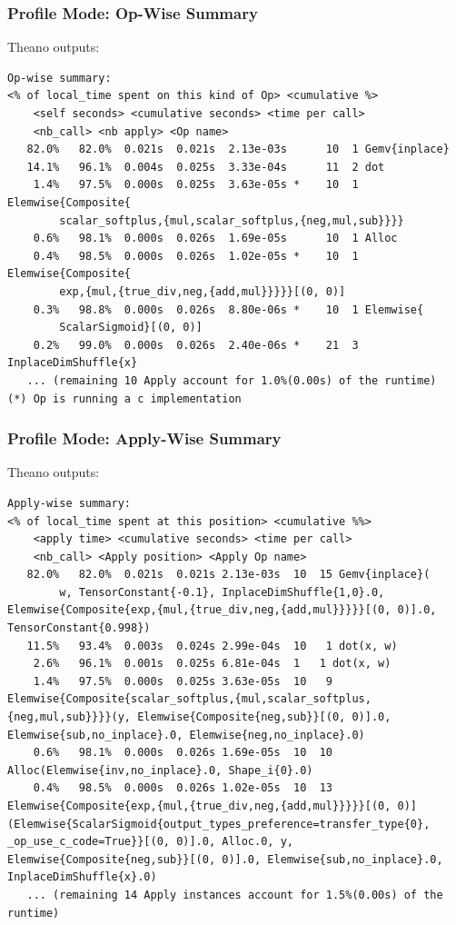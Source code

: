 \documentclass[a4paper,9pt]{beamer}
\begin{document}
\begin{frame}[fragile]
\frametitle{Profile Mode: Op-Wise Summary}
Theano outputs:
\vfill
\begin{Verbatim}
Op-wise summary:
<% of local_time spent on this kind of Op> <cumulative %>
    <self seconds> <cumulative seconds> <time per call>
    <nb_call> <nb apply> <Op name>
   82.0%   82.0%  0.021s  0.021s  2.13e-03s      10  1 Gemv{inplace}
   14.1%   96.1%  0.004s  0.025s  3.33e-04s      11  2 dot
    1.4%   97.5%  0.000s  0.025s  3.63e-05s *    10  1 Elemwise{Composite{
        scalar_softplus,{mul,scalar_softplus,{neg,mul,sub}}}}
    0.6%   98.1%  0.000s  0.026s  1.69e-05s      10  1 Alloc
    0.4%   98.5%  0.000s  0.026s  1.02e-05s *    10  1 Elemwise{Composite{
        exp,{mul,{true_div,neg,{add,mul}}}}}[(0, 0)]
    0.3%   98.8%  0.000s  0.026s  8.80e-06s *    10  1 Elemwise{
        ScalarSigmoid}[(0, 0)]
    0.2%   99.0%  0.000s  0.026s  2.40e-06s *    21  3 InplaceDimShuffle{x}
   ... (remaining 10 Apply account for 1.0%(0.00s) of the runtime)
(*) Op is running a c implementation
\end{Verbatim}
\end{frame}

\begin{frame}[fragile]
\frametitle{Profile Mode: Apply-Wise Summary}
Theano outputs:
\vfill
\begin{Verbatim}
Apply-wise summary:
<% of local_time spent at this position> <cumulative %%>
    <apply time> <cumulative seconds> <time per call>
    <nb_call> <Apply position> <Apply Op name>
   82.0%   82.0%  0.021s  0.021s 2.13e-03s  10  15 Gemv{inplace}(
        w, TensorConstant{-0.1}, InplaceDimShuffle{1,0}.0, Elemwise{Composite{exp,{mul,{true_div,neg,{add,mul}}}}}[(0, 0)].0, TensorConstant{0.998})
   11.5%   93.4%  0.003s  0.024s 2.99e-04s  10   1 dot(x, w)
    2.6%   96.1%  0.001s  0.025s 6.81e-04s  1   1 dot(x, w)
    1.4%   97.5%  0.000s  0.025s 3.63e-05s  10   9 Elemwise{Composite{scalar_softplus,{mul,scalar_softplus,{neg,mul,sub}}}}(y, Elemwise{Composite{neg,sub}}[(0, 0)].0, Elemwise{sub,no_inplace}.0, Elemwise{neg,no_inplace}.0)
    0.6%   98.1%  0.000s  0.026s 1.69e-05s  10  10 Alloc(Elemwise{inv,no_inplace}.0, Shape_i{0}.0)
    0.4%   98.5%  0.000s  0.026s 1.02e-05s  10  13 Elemwise{Composite{exp,{mul,{true_div,neg,{add,mul}}}}}[(0, 0)](Elemwise{ScalarSigmoid{output_types_preference=transfer_type{0}, _op_use_c_code=True}}[(0, 0)].0, Alloc.0, y, Elemwise{Composite{neg,sub}}[(0, 0)].0, Elemwise{sub,no_inplace}.0, InplaceDimShuffle{x}.0)
   ... (remaining 14 Apply instances account for 1.5%(0.00s) of the runtime)
\end{Verbatim}
\end{frame}
\end{document}
